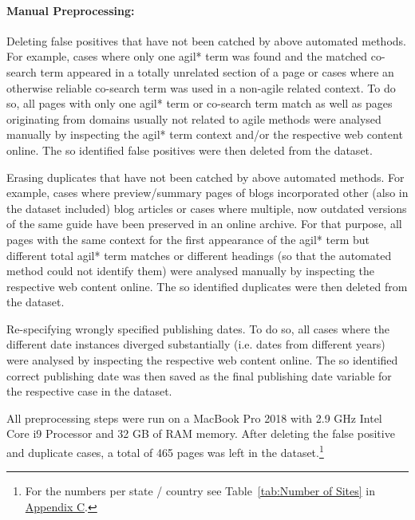 \paragraph{Manual Preprocessing:}
\begin{compactitem}
\item Deleting false positives that have not been catched by above automated methods. For example, cases where only one agil* term was found and the matched co-search term appeared in a totally unrelated section of a page or cases where an otherwise reliable co-search term was used in a non-agile related context. To do so, all pages with only one agil* term or co-search term match as well as pages originating from domains usually not related to agile methods were analysed manually by inspecting the agil* term context and/or the respective web content online. The so identified false positives were then deleted from the dataset.
\item Erasing duplicates that have not been catched by above automated methods. For example, cases where preview/summary pages of blogs incorporated other (also in the dataset included) blog articles or cases where multiple, now outdated versions of the same guide have been preserved in an online archive. For that purpose, all pages with the same context for the first appearance of the agil* term but different total agil* term matches or different headings (so that the automated method could not identify them) were analysed manually by inspecting the respective web content online. The so identified duplicates were then deleted from the dataset.
\item Re-specifying wrongly specified publishing dates. To do so, all cases where the different date instances diverged substantially (i.e. dates from different years) were analysed by inspecting the respective web content online. The so identified correct publishing date was then saved as the final publishing date variable for the respective case in the dataset. 
\end{compactitem}

\vspace{\baselineskip}

All preprocessing steps were run on a MacBook Pro 2018 with 2.9 GHz Intel Core i9 Processor and 32 GB of RAM memory. After deleting the false positive and duplicate cases, a total of 465 pages was left in the dataset.\footnote{For the numbers per state / country see Table~\ref{tab:Number of Sites} in \href{Appendix C}{Appendix C}.}



